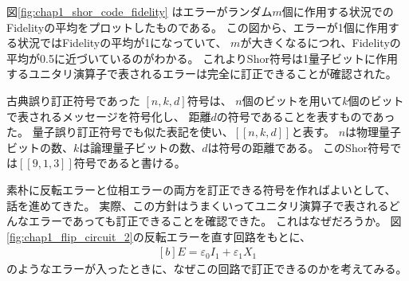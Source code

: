 \documentclass[../master.tex]{subfiles}
\begin{document}
図\ref{fig:chap1_shor_code_fidelity}
はエラーがランダム\(m\)個に作用する状況でのFidelityの平均をプロットしたものである。
この図から、エラーが1個に作用する状況ではFidelityの平均が1になっていて、
\(m\)が大きくなるにつれ、Fidelityの平均が0.5に近づいているのがわかる。
これよりShor符号は1量子ビットに作用するユニタリ演算子で表されるエラーは完全に訂正できることが確認された。

古典誤り訂正符号であった \([n,k,d]\)符号は、
\(n\)個のビットを用いて\(k\)個のビットで表されるメッセージを符号化し、
距離\(d\)の符号であることを表すものであった。
量子誤り訂正符号でも似た表記を使い、\([[n,k,d]]\)と表す。
\(n\)は物理量子ビットの数、\(k\)は論理量子ビットの数、\(d\)は符号の距離である。
このShor符号では\([[9,1,3]]\)符号であると書ける。

\bigskip
素朴に反転エラーと位相エラーの両方を訂正できる符号を作ればよいとして、
話を進めてきた。
実際、この方針はうまくいってユニタリ演算子で表されるどんなエラーであっても訂正できることを確認できた。
これはなぜだろうか。
図\ref{fig:chap1_flip_circuit_2}の反転エラーを直す回路をもとに、
\begin{equation}\begin{aligned}[b]
    E = \varepsilon_0 I_1 + \varepsilon_1 X_1
\end{aligned}\end{equation}
のようなエラーが入ったときに、なぜこの回路で訂正できるのかを考えてみる。
\end{document}

